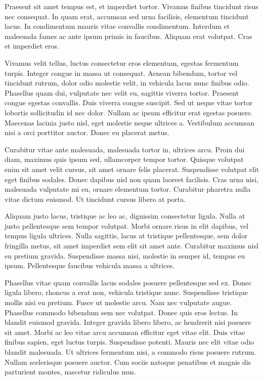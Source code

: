 \documentclass[12pt, letterpaper,twocolumn]{article}
\begin{document}
Praesent sit amet tempus est, et imperdiet tortor. Vivamus finibus tincidunt risus nec consequat. In quam erat, accumsan sed urna facilisis, elementum tincidunt lacus. In condimentum mauris vitae convallis condimentum. Interdum et malesuada fames ac ante ipsum primis in faucibus. Aliquam erat volutpat. Cras et imperdiet eros.

Vivamus velit tellus, luctus consectetur eros elementum, egestas fermentum turpis. Integer congue in massa ut consequat. Aenean bibendum, tortor vel tincidunt rutrum, dolor odio molestie velit, in vehicula lacus nunc finibus odio. Phasellus quam dui, vulputate nec velit eu, sagittis viverra tortor. Praesent congue egestas convallis. Duis viverra congue suscipit. Sed ut neque vitae tortor lobortis sollicitudin id nec dolor. Nullam ac ipsum efficitur erat egestas posuere. Maecenas lacinia justo nisl, eget molestie neque ultrices a. Vestibulum accumsan nisi a orci porttitor auctor. Donec eu placerat metus.

Curabitur vitae ante malesuada, malesuada tortor in, ultrices arcu. Proin dui diam, maximus quis ipsum sed, ullamcorper tempor tortor. Quisque volutpat enim sit amet velit cursus, sit amet ornare felis placerat. Suspendisse volutpat elit eget finibus sodales. Donec dapibus nisl non quam laoreet facilisis. Cras urna nisi, malesuada vulputate mi eu, ornare elementum tortor. Curabitur pharetra nulla vitae dictum euismod. Ut tincidunt cursus libero at porta.

Aliquam justo lacus, tristique ac leo ac, dignissim consectetur ligula. Nulla at justo pellentesque sem tempor volutpat. Morbi ornare risus in elit dapibus, vel tempus ligula ultrices. Nulla sagittis, lacus at tristique pellentesque, sem dolor fringilla metus, sit amet imperdiet sem elit sit amet ante. Curabitur maximus nisl eu pretium gravida. Suspendisse massa nisi, molestie in semper id, tempus eu ipsum. Pellentesque faucibus vehicula massa a ultrices.

Phasellus vitae quam convallis lacus sodales posuere pellentesque sed ex. Donec ligula libero, rhoncus a erat non, vehicula tristique nunc. Suspendisse tristique mollis nisi eu pretium. Fusce ut molestie arcu. Nam nec vulputate augue. Phasellus commodo bibendum sem nec volutpat. Donec quis eros lectus. In blandit euismod gravida. Integer gravida libero libero, ac hendrerit nisi posuere sit amet. Morbi ac leo vitae arcu accumsan efficitur eget vitae elit. Duis vitae finibus sapien, eget luctus turpis. Suspendisse potenti. Mauris nec elit vitae odio blandit malesuada. Ut ultrices fermentum nisi, a commodo risus posuere rutrum. Nullam scelerisque posuere auctor. Cum sociis natoque penatibus et magnis dis parturient montes, nascetur ridiculus mus.
\end{document}
